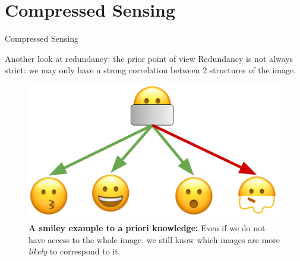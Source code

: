 \section{Compressed Sensing}

\begin{frame}[plain,c]
    
    \begin{center}
        \color{DarkBlue}
    \Huge Compressed Sensing
    \end{center}
    
\end{frame}

\begin{frame}{Another look at redundancy: the prior point of view}
    Redundancy is not always strict: we may only have a strong correlation between 2 structures of the image.
    \begin{figure}
        \centering
        \includegraphics[height=0.5\textheight]{Figures/cs_figures/smiley_prior.pdf}
        \caption{\label{fig:redundancy-smiley}\textbf{A smiley example to a priori knowledge:} Even if we do not have access to the whole image, we still know which images are more \emph{likely} to correspond to it.
        }
    \end{figure}
\end{frame}

